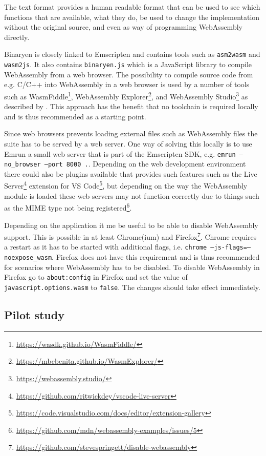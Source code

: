 The text format provides a human readable format that can be used to see which functions that are available, what they do, be used to change the implementation without the original source, and even as way of programming WebAssembly directly.


Binaryen is closely linked to Emscripten and contains tools such as \texttt{asm2wasm} and \texttt{wasm2js}. It also contains \texttt{binaryen.js} which is a JavaScript library to compile WebAssembly from a web browser. The possibility to compile source code from e.g. C/C++ into WebAssembly in a web browser is used by a number of tools such as WasmFiddle\footnote{\url{https://wasdk.github.io/WasmFiddle/}}, WebAssembly Explorer\footnote{\url{https://mbebenita.github.io/WasmExplorer/}}, and WebAssembly Studio\footnote{\url{https://webassembly.studio/}} as described by \textcite{Rourke2018}. This approach has the benefit that no toolchain is required locally and is thus recommended as a starting point.

Since web browsers prevents loading external files such as WebAssembly files the suite has to be served by a web server. One way of solving this locally is to use Emrun a small web server that is part of the Emscripten SDK, e.g. \texttt{emrun --no\_browser --port 8000 .}. Depending on the web development environment there could also be plugins available that provides such features such as the Live Server\footnote{\url{https://github.com/ritwickdey/vscode-live-server}} extension for VS Code\footnote{\url{https://code.visualstudio.com/docs/editor/extension-gallery}}, but depending on the way the WebAssembly module is loaded these web servers may not function correctly due to things such as the MIME type not being registered\footnote{\url{https://github.com/mdn/webassembly-examples/issues/5}}.

Depending on the application it me be useful to be able to disable WebAssembly support. This is possible in at least Chrome(ium) and Firefox\footnote{\url{https://github.com/stevespringett/disable-webassembly}}. Chrome requires a restart as it has to be started with additional flags, i.e. \texttt{chrome --js-flags=--noexpose\_wasm}. Firefox does not have this requirement and is thus recommended for scenarios where WebAssembly has to be disabled. To disable WebAssembly in Firefox go to \texttt{about:config} in Firefox and set the value of \texttt{javascript.options.wasm} to \texttt{false}. The changes should take effect immediately.


\clearpage

\subsection{Pilot study}

